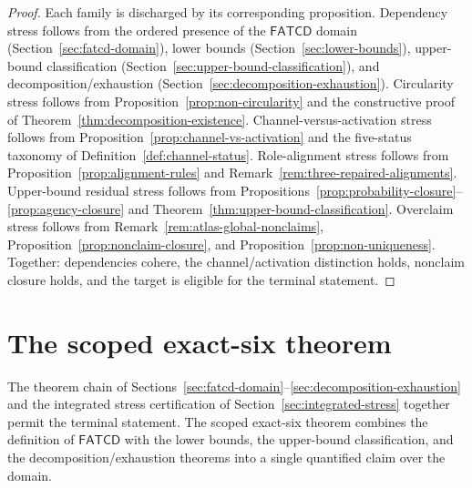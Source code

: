 \documentclass[11pt]{article}
\theoremstyle{definition}
\newcommand{\FATCD}{\ensuremath{\mathsf{FATCD}}}
\begin{document}
\begin{proof}
Each family is discharged by its corresponding proposition.
Dependency stress follows from the ordered presence of the \FATCD{}
domain (Section~\ref{sec:fatcd-domain}), lower bounds
(Section~\ref{sec:lower-bounds}), upper-bound classification
(Section~\ref{sec:upper-bound-classification}), and
decomposition/exhaustion (Section~\ref{sec:decomposition-exhaustion}).
Circularity stress follows from
Proposition~\ref{prop:non-circularity} and the constructive proof of
Theorem~\ref{thm:decomposition-existence}. Channel-versus-activation
stress follows from Proposition~\ref{prop:channel-vs-activation} and
the five-status taxonomy of Definition~\ref{def:channel-status}.
Role-alignment stress follows from
Proposition~\ref{prop:alignment-rules} and
Remark~\ref{rem:three-repaired-alignments}. Upper-bound residual
stress follows from
Propositions~\ref{prop:probability-closure}--\ref{prop:agency-closure}
and Theorem~\ref{thm:upper-bound-classification}. Overclaim stress
follows from Remark~\ref{rem:atlas-global-nonclaims},
Proposition~\ref{prop:nonclaim-closure}, and
Proposition~\ref{prop:non-uniqueness}. Together: dependencies cohere,
the channel/activation distinction holds, nonclaim closure holds, and
the target is eligible for the terminal statement.
\end{proof}
 \section{The scoped exact-six theorem}\label{sec:scoped-exact-six}




The theorem chain of
Sections~\ref{sec:fatcd-domain}--\ref{sec:decomposition-exhaustion}
and the integrated stress certification of
Section~\ref{sec:integrated-stress} together permit the terminal
statement. The scoped exact-six theorem combines the definition of
\FATCD{} with the lower bounds, the upper-bound classification, and
the decomposition/exhaustion theorems into a single quantified claim
over the domain.
\end{document}
